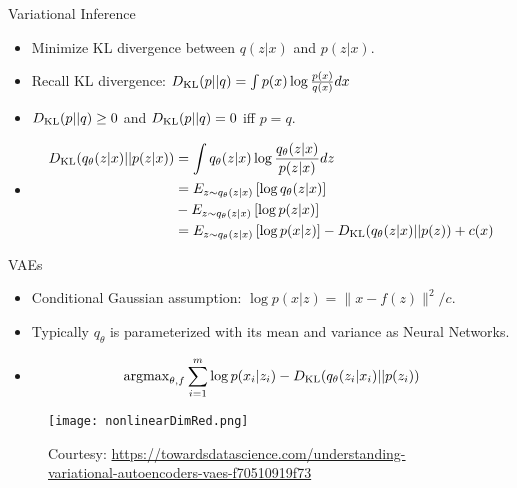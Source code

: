 \documentclass[final]{beamer}
\begin{document}
\begin{frame}{Variational Inference}
	\begin{itemize}
		\item Minimize KL divergence between $q(z|x)$ and $p(z|x)$.
		\item Recall KL divergence: $D_{\rm KL}(p||q) = \int p(x) \log \frac{p(x)}{q(x)} dx$ 
		\pause
		\item $D_{\rm KL}(p||q) \geq 0$ and $D_{\rm KL}(p||q) = 0$ iff $p = q$. 
		\pause
		\item 
		\begin{align*}
		D_{\rm KL}(q_\theta(z|x)||p(z|x)) &= \int q_\theta(z|x) \log \frac{q_\theta(z|x)}{p(z|x)} dz \\
			&= E_{z \sim q_\theta(z|x)} \left[\log q_\theta(z|x)\right] \\
			&- E_{z \sim q_\theta(z|x)} \left[\log p(z|x)\right]  \\
		&= E_{z \sim q_\theta(z|x)} \left[\log p(x|z)\right] - D_{\rm KL}(q_\theta(z|x)||p(z)) + c(x) \\
		\end{align*}
	\end{itemize}
	
\end{frame}
\begin{frame}{VAEs}
	\begin{itemize}
		\item Conditional Gaussian assumption: $\log p(x|z) = \|x-f(z)\|^2/c.$
		\pause 
		\item Typically $q_\theta$ is parameterized with its mean and variance as Neural Networks.
		\pause
		\item \begin{align}
			{\rm arg max}_{\theta, f} \sum_{i=1}^m \log p(x_i|z_i) - D_{\rm KL}(q_\theta(z_i|x_i)||p(z_i))
			\end{align}
			
	\end{itemize}
\end{frame}
\begin{frame}
\begin{figure}
	\texttt{[image: nonlinearDimRed.png]}
	\caption{Courtesy: \url{https://towardsdatascience.com/understanding-variational-autoencoders-vaes-f70510919f73}}
\end{figure}
\end{frame}
\end{document}
